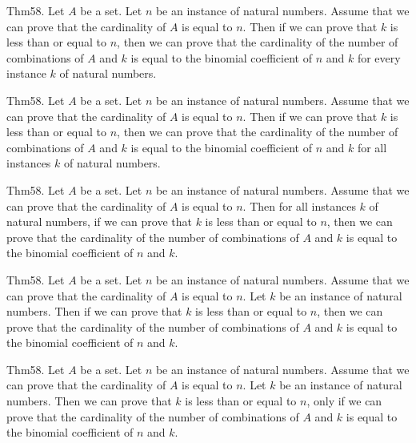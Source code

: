 \documentclass{article}
\begin{document}
Thm58. Let $A$ be a set. Let $n$ be an instance of natural numbers. Assume that we can prove that the cardinality of $A$ is equal to $n$. Then if we can prove that $k$ is less than or equal to $n$, then we can prove that the cardinality of the number of combinations of $A$ and $k$ is equal to the binomial coefficient of $n$ and $k$ for every instance $k$ of natural numbers.

Thm58. Let $A$ be a set. Let $n$ be an instance of natural numbers. Assume that we can prove that the cardinality of $A$ is equal to $n$. Then if we can prove that $k$ is less than or equal to $n$, then we can prove that the cardinality of the number of combinations of $A$ and $k$ is equal to the binomial coefficient of $n$ and $k$ for all instances $k$ of natural numbers.

Thm58. Let $A$ be a set. Let $n$ be an instance of natural numbers. Assume that we can prove that the cardinality of $A$ is equal to $n$. Then for all instances $k$ of natural numbers, if we can prove that $k$ is less than or equal to $n$, then we can prove that the cardinality of the number of combinations of $A$ and $k$ is equal to the binomial coefficient of $n$ and $k$.

Thm58. Let $A$ be a set. Let $n$ be an instance of natural numbers. Assume that we can prove that the cardinality of $A$ is equal to $n$. Let $k$ be an instance of natural numbers. Then if we can prove that $k$ is less than or equal to $n$, then we can prove that the cardinality of the number of combinations of $A$ and $k$ is equal to the binomial coefficient of $n$ and $k$.

Thm58. Let $A$ be a set. Let $n$ be an instance of natural numbers. Assume that we can prove that the cardinality of $A$ is equal to $n$. Let $k$ be an instance of natural numbers. Then we can prove that $k$ is less than or equal to $n$, only if we can prove that the cardinality of the number of combinations of $A$ and $k$ is equal to the binomial coefficient of $n$ and $k$.
\end{document}
